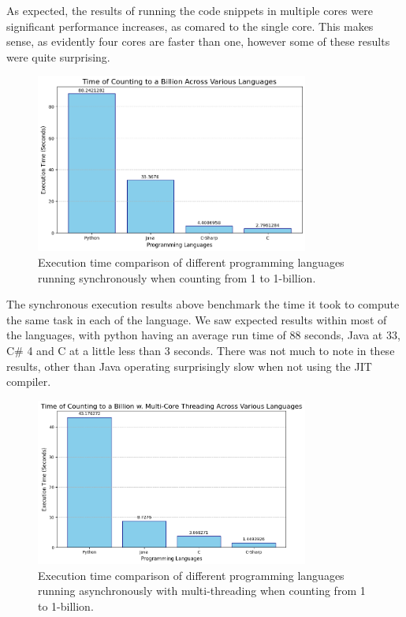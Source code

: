 \documentclass[12pt,a4paper]{article}
\begin{document}
As expected, the results of running the code snippets in multiple cores were significant performance increases, as comared to the single core. This makes sense, as evidently four cores are faster than one, however some of these results were quite surprising.

\begin{figure}[!htb]
    \centering
    \includegraphics[width=0.8\textwidth]{../sync_records/sync_exec_times.png}
    \captionsetup{font=tiny, justification=centering}
    \caption{Execution time comparison of different programming languages running synchronously when counting from 1 to 1-billion.}
    \label{fig:sync-exec-times}
\end{figure}


The synchronous execution results above benchmark the time it took to compute the same task in each of the language. We saw expected results within most of the languages, with python having an average run time of 88 seconds, Java at 33, C\# 4 and C at a little less than 3 seconds. There was not much to note in these results, other than Java operating surprisingly slow when not using the JIT compiler.


\begin{figure}[!htb]
    \centering
    \includegraphics[width=0.8\textwidth]{../async_records/async_exec_times.png}
    \captionsetup{font=tiny, justification=centering}
    \caption{Execution time comparison of different programming languages running asynchronously with multi-threading when counting from 1 to 1-billion.}
    \label{fig:async-exec-times}
\end{figure}
\end{document}
